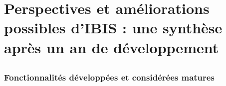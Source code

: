 \chapter{Perspectives et améliorations possibles d'IBIS : une synthèse après un an de développement}\label{ch:resultats-et-failles-d'ibis-:-une-synthese-apres-un-an-de-developpement2}\label{ch:resultats-et-failles-d'ibis-:-une-synthese-apres-un-an-de-developpement}
%
%
%

\section{}\label{sec:etat-des-lieux}

    \subsection{Fonctionnalités développées et considérées matures}\label{subsec:fonctionnalites-developpeeset-considerees-matures}

